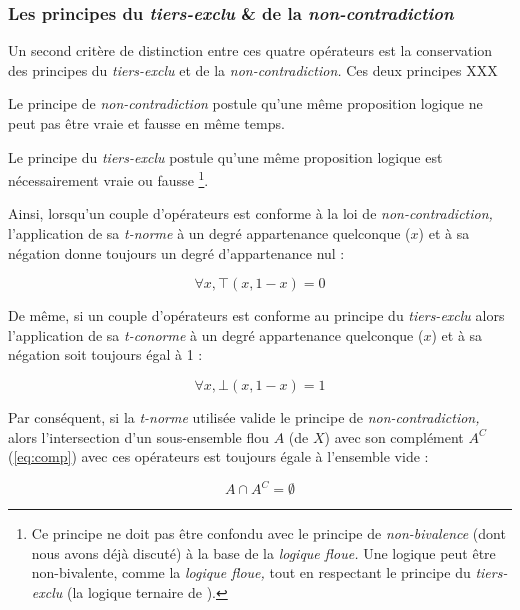 \subsubsection{Les principes du \emph{tiers-exclu} \& de la
  \emph{non-contradiction}}

Un second critère de distinction entre ces quatre opérateurs est la
conservation des principes du \emph{tiers-exclu} et de la
\emph{non-contradiction.} Ces deux principes XXX

Le principe de \emph{non-contradiction} postule qu'une même proposition
logique ne peut pas être vraie et fausse en même temps.


Le principe du \emph{tiers-exclu} postule qu'une même proposition
logique est nécessairement vraie ou fausse \footnote{Ce principe ne
  doit pas être confondu avec le principe de \emph{non-bivalence}
  (dont nous avons déjà discuté) à la base de la \emph{logique floue.}
  Une logique peut être non-bivalente, comme la \emph{logique floue,}
  tout en respectant le principe du \emph{tiers-exclu} (\eg la logique
  ternaire de ).}.






Ainsi, lorsqu'un couple d'opérateurs est conforme à la loi de
\emph{non-contradiction,} l’application de sa \emph{t-norme} à un
degré appartenance quelconque (\(x\)) et à sa négation donne toujours un
degré d'appartenance nul : 

\begin{equation}
  \forall x, ⊤(x,1-x) = 0
\end{equation}

De même, si un couple d'opérateurs est conforme au principe du
\emph{tiers-exclu} alors l’application de sa \emph{t-conorme} à un
degré appartenance quelconque (\(x\))  et à sa négation soit
toujours égal à 1 :

\begin{equation}
  \forall x, ⊥(x,1-x) = 1
\end{equation}

Par conséquent, si la \emph{t-norme} utilisée valide le principe de
\emph{non-contradiction,} alors l'intersection d'un sous-ensemble flou
\(A\) (de \(X\)) avec son complément \(A^C\) (\autoref{eq:comp}) avec
ces opérateurs est toujours égale à l'ensemble vide :

\begin{equation}
  A \cap A^C = \emptyset
\end{equation}

